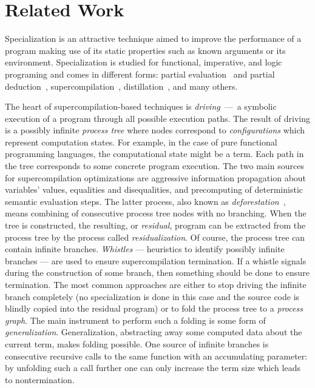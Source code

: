 \section{Related Work}

Specialization is an attractive technique aimed to improve the performance of a program making use of its static properties such as known arguments or its environment.
Specialization is studied for functional, imperative, and logic programing and comes in different forms: partial evaluation~\cite{jonesbook} and partial deduction~\cite{lloyd1991partial}, supercompilation~\cite{soerensen1996positive}, distillation~\cite{hamilton2007distillation}, and many others.


The heart of supercompilation-based techniques is \emph{driving}~---~a symbolic execution of a program through all possible execution paths.
The result of driving is a possibly infinite \emph{process tree} where nodes correspond to \emph{configurations} which represent computation states.
For example, in the case of pure functional programming languages, the computational state might be a term.
Each path in the tree corresponds to some concrete program execution.
The two main sources for supercompilation optimizations are aggressive information propagation about variables' values, equalities and disequalities, and precomputing of deterministic semantic evaluation steps.
The latter process, also known as \emph{deforestation}~\cite{deforestation}, means  combining of consecutive process tree nodes with no branching.
When the tree is constructed, the resulting, or \emph{residual}, program can be extracted from the process tree by the process called \emph{residualization}.
Of course, the process tree can contain infinite branches.
\emph{Whistles} --- heuristics to identify possibly infinite branches --- are used to ensure supercompilation termination.
If a whistle signals during the construction of some branch, then something should be done to ensure termination.
The most common approaches are either to stop driving the infinite branch completely (no specialization is done in this case and the source code is blindly copied into the residual program) or to fold the process tree to a \emph{process graph}.
The main instrument to perform such a folding is some form of \emph{generalization}.
Generalization, abstracting away some computed data about the current term, makes folding possible.
One source of infinite branches is consecutive recursive calls to the same function with an accumulating parameter: by unfolding such a call further one can only increase the term size which leads to nontermination.
